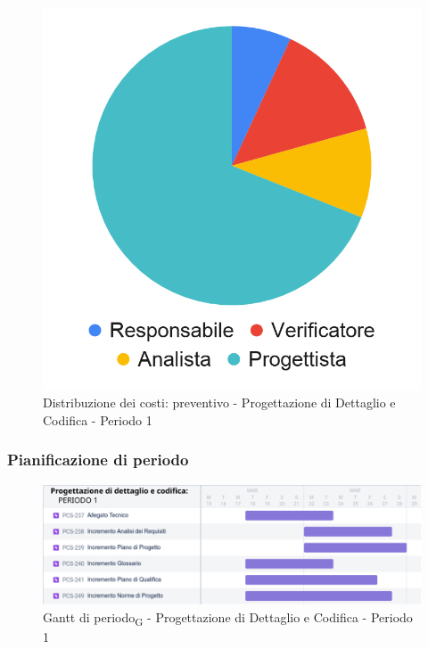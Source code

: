 \hspace{-1cm}
\begin{minipage}{.50\textwidth}
\smallPreventivoTable{
	
}
\end{minipage}
\hspace{1cm}
\begin{minipage}{.40\textwidth}
\begin{figure}[H]
	\includegraphics[scale=0.21]{res/images/charts/preventivo_priori/Grafico4-6.png}
	\caption{Distribuzione dei costi: preventivo - Progettazione di Dettaglio e Codifica - Periodo 1}
\end{figure}
\end{minipage} 



\subsubsection{Pianificazione di periodo}


\begin{figure}[H]
	\centering
	\includegraphics[scale=0.55]{res/images/gantt_periodo/progdett_1_gantt.png}
	\caption{Gantt di periodo\textsubscript{G} - Progettazione di Dettaglio e Codifica - Periodo 1}
\end{figure}

